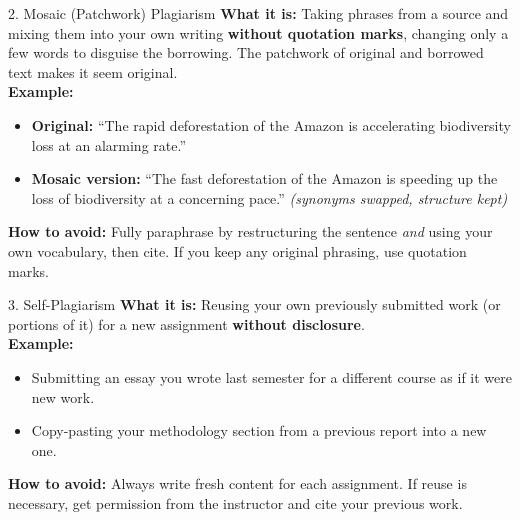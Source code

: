 \documentclass[12pt,a4paper]{article}
\begin{document}
\begin{warnbox}{2. Mosaic (Patchwork) Plagiarism}
\textbf{What it is:} Taking phrases from a source and mixing them into your own writing \textbf{without quotation marks}, changing only a few words to disguise the borrowing. The patchwork of original and borrowed text makes it seem original.\\[0.2cm]
\textbf{Example:}
\begin{itemize}[noitemsep]
    \item \textbf{Original:} ``The rapid deforestation of the Amazon is accelerating biodiversity loss at an alarming rate.''
    \item \textbf{Mosaic version:} ``The fast deforestation of the Amazon is speeding up the loss of biodiversity at a concerning pace.'' \textit{(synonyms swapped, structure kept)}
\end{itemize}
\textbf{How to avoid:} Fully paraphrase by restructuring the sentence \textit{and} using your own vocabulary, then cite. If you keep any original phrasing, use quotation marks.
\end{warnbox}

\begin{warnbox}{3. Self-Plagiarism}
\textbf{What it is:} Reusing your own previously submitted work (or portions of it) for a new assignment \textbf{without disclosure}.\\[0.2cm]
\textbf{Example:}
\begin{itemize}[noitemsep]
    \item Submitting an essay you wrote last semester for a different course as if it were new work.
    \item Copy-pasting your methodology section from a previous report into a new one.
\end{itemize}
\textbf{How to avoid:} Always write fresh content for each assignment. If reuse is necessary, get permission from the instructor and cite your previous work.
\end{warnbox}
\end{document}
